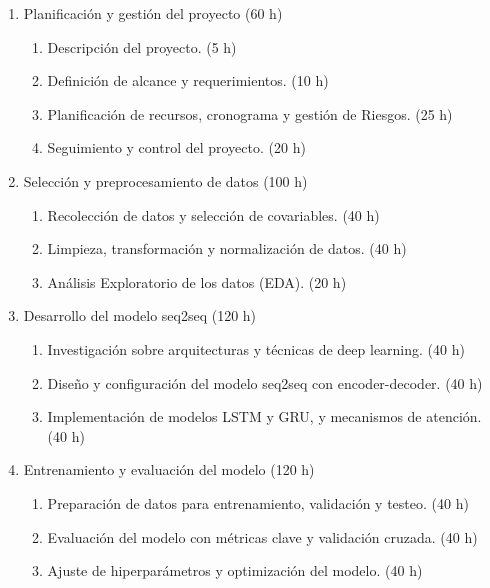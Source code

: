 \documentclass[
11pt, %
]{charter}
\begin{document}
%
\begin{enumerate}
	\item Planificación y gestión del proyecto (60 h)
	\begin{enumerate}
		\item Descripción del proyecto. (5 h)
		\item Definición de alcance y requerimientos. (10 h)
		\item Planificación de recursos, cronograma y gestión de Riesgos. (25 h)
		\item Seguimiento y control del proyecto. (20 h)
	\end{enumerate}
	
	\item Selección y preprocesamiento de datos (100 h)
	\begin{enumerate}
		\item Recolección de datos y selección de covariables. (40 h)
		\item Limpieza, transformación y normalización de datos. (40 h)
		\item Análisis Exploratorio de los datos (EDA). (20 h)
	\end{enumerate}
	
	\item Desarrollo del modelo seq2seq (120 h)
	\begin{enumerate}
		\item Investigación sobre arquitecturas y técnicas de deep learning. (40 h)
		\item Diseño y configuración del modelo seq2seq con encoder-decoder. (40 h)
		\item Implementación de modelos LSTM y GRU, y mecanismos de atención. (40 h)

	\end{enumerate}
	
	\item Entrenamiento y evaluación del modelo (120 h)
	\begin{enumerate}
		\item Preparación de datos para entrenamiento, validación y testeo. (40 h)
		\item Evaluación del modelo con métricas clave y validación cruzada. (40 h)
		\item Ajuste de hiperparámetros y optimización del modelo. (40 h)
	\end{enumerate}
	

\end{enumerate}
\end{document}
